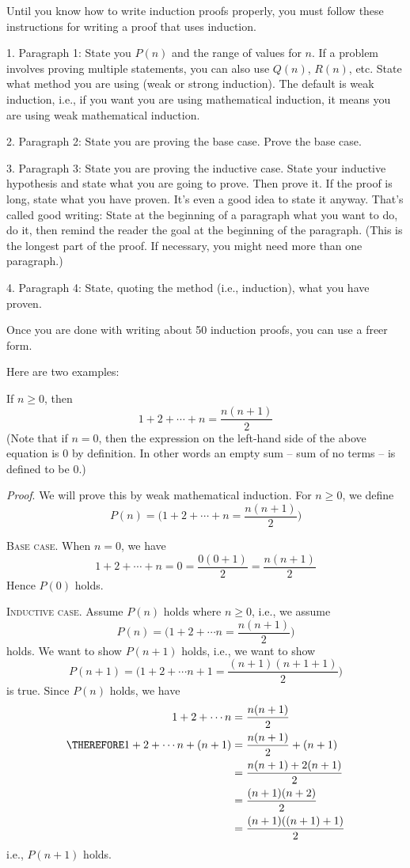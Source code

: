 Until you know how to write induction proofs properly, you must follow these
instructions for writing a proof that uses induction.
\begin{tightlist}
\item[1.]
  Paragraph 1: State you $P(n)$ and the range of values for $n$.
  If a problem involves proving multiple statements, you can also use
  $Q(n)$, $R(n)$, etc.
  State what method you are using (weak or strong induction).
  The default is weak induction, i.e., if you want you are using
  mathematical induction, it means you are using weak mathematical induction.
\item [2.]
  Paragraph 2: State you are proving the base case.
  Prove the base case.
\item [3.]
  Paragraph 3: State you are proving the inductive case.
  State your inductive hypothesis and state what you are going to prove.
  Then prove it. If the proof is long, state what you have proven.
  It's even a good idea to state it anyway. That's called good writing:
  State at the beginning of a paragraph what you want to do, do it, then
  remind the reader the goal at the beginning of the paragraph.
  (This is the longest part of the proof. If necessary, you might need
  more than one paragraph.)
\item [4.]
  Paragraph 4:
  State, quoting the method (i.e., induction), what you have proven.
\end{tightlist}
Once you are done with writing about 50 induction proofs, you can use a
freer form.

Here are two examples:

\newpage

\begin{thm}
  If $n \geq 0$, then
  \[
    1 + 2 + \cdots + n = \frac{n(n + 1)}{2}
  \]
  (Note that if $n = 0$, then the expression on the left-hand side of the above
  equation is 0 by definition.
  In other words an empty sum -- sum of no terms -- is defined to be 0.)
\end{thm}

\textit{Proof}.
We will prove this by weak mathematical induction.
For $n \geq 0$, we define
\[
  P(n) = \biggl( 1 + 2 + \cdots + n = \frac{n(n + 1)}{2} \biggr)
\]

\textsc{Base case.}
When $n = 0$, we have
\[
1 + 2 + \cdots + n = 0 = \frac{0(0 + 1)}{2} = \frac{n (n + 1)}{2}
\]
Hence $P(0)$ holds.

\textsc{Inductive case.}
Assume $P(n)$ holds where $n \geq 0$, i.e., we assume
\[
  P(n) = \biggl( 1 + 2 + \cdots n = \frac{n(n + 1)}{2} \biggr)
\]
holds.
We want to show $P(n + 1)$ holds, i.e., we want to show
\[
P(n + 1) =
\biggl(
1 + 2 + \cdots n + 1 = \frac{(n + 1)(n + 1 + 1)}{2}
\biggr)
\]
is true.
Since $P(n)$ holds, we have
\begin{align*}
  1 + 2 + \cdots n
  &= \frac{n(n + 1)}{2} \\
  \THEREFORE 1 + 2 + \cdots n + (n + 1)
  &= \frac{n(n + 1)}{2} + (n + 1) \\
  &= \frac{n(n + 1) + 2(n + 1)}{2} \\
  &= \frac{(n + 1)(n + 2)}{2} \\
  &= \frac{(n + 1)((n + 1) + 1)}{2}
\end{align*}
i.e., $P(n + 1)$ holds.

